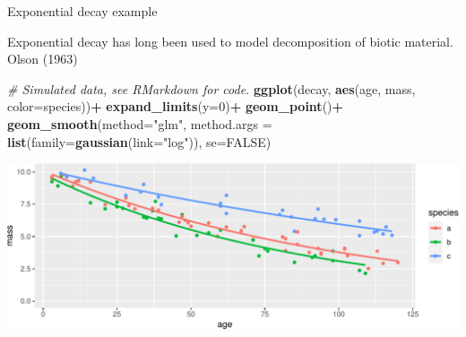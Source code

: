 \documentclass[
  ignorenonframetext,
]{beamer}
\newenvironment{Shaded}{\begin{snugshade}}{\end{snugshade}}
\newcommand{\CommentTok}[1]{\textcolor[rgb]{0.56,0.35,0.01}{\textit{#1}}}
\newcommand{\DataTypeTok}[1]{\textcolor[rgb]{0.13,0.29,0.53}{#1}}
\newcommand{\DecValTok}[1]{\textcolor[rgb]{0.00,0.00,0.81}{#1}}
\newcommand{\KeywordTok}[1]{\textcolor[rgb]{0.13,0.29,0.53}{\textbf{#1}}}
\newcommand{\NormalTok}[1]{#1}
\newcommand{\OperatorTok}[1]{\textcolor[rgb]{0.81,0.36,0.00}{\textbf{#1}}}
\newcommand{\OtherTok}[1]{\textcolor[rgb]{0.56,0.35,0.01}{#1}}
\newcommand{\StringTok}[1]{\textcolor[rgb]{0.31,0.60,0.02}{#1}}
\begin{document}
\begin{frame}[fragile]{Exponential decay example}
\protect\hypertarget{exponential-decay-example}{}

Exponential decay has long been used to model decomposition of biotic
material. Olson (1963)

\scriptsize

\begin{Shaded}
\begin{Highlighting}[]
\CommentTok{# Simulated data, see RMarkdown for code.}
\KeywordTok{ggplot}\NormalTok{(decay, }\KeywordTok{aes}\NormalTok{(age, mass, }\DataTypeTok{color=}\NormalTok{species))}\OperatorTok{+}\StringTok{  }
\StringTok{  }\KeywordTok{expand_limits}\NormalTok{(}\DataTypeTok{y=}\DecValTok{0}\NormalTok{)}\OperatorTok{+}
\StringTok{  }\KeywordTok{geom_point}\NormalTok{()}\OperatorTok{+}
\StringTok{  }\KeywordTok{geom_smooth}\NormalTok{(}\DataTypeTok{method=}\StringTok{"glm"}\NormalTok{, }
              \DataTypeTok{method.args =} \KeywordTok{list}\NormalTok{(}\DataTypeTok{family=}\KeywordTok{gaussian}\NormalTok{(}\DataTypeTok{link=}\StringTok{"log"}\NormalTok{)),}
              \DataTypeTok{se=}\OtherTok{FALSE}\NormalTok{)}
\end{Highlighting}
\end{Shaded}

\includegraphics{signal_files/figure-beamer/unnamed-chunk-6-1.pdf}

\end{frame}
\end{document}
